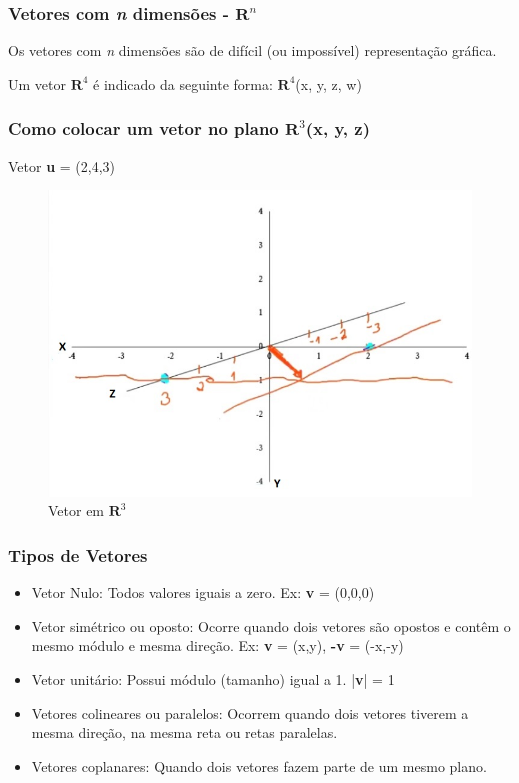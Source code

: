 \documentclass[12pt]{article}
\begin{document}
\subsubsection{Vetores com \textit{n} dimensões - \( \mathbf{R}^{n} \)}

Os vetores com \textit{n} dimensões são de difícil (ou impossível) representação gráfica.

Um vetor \( \mathbf{R}^{4} \) é indicado da seguinte forma: \( \mathbf{R}^{4} \)(x, y, z, w)

\subsubsection{Como colocar um vetor no plano \( \mathbf{R}^{3} \)(x, y, z)}

Vetor \textbf{u} = (2,4,3)

\begin{figure}[H]
	\centering
	\includegraphics[width=0.7\linewidth]{figuras/R3}
	\caption[Vetor em \( \mathbf{R}^{3} \)]{Vetor em \( \mathbf{R}^{3} \)}
	\label{fig:vetor r3}
\end{figure}

\subsubsection{Tipos de Vetores}

\begin{itemize}
	\item Vetor Nulo: Todos valores iguais a zero. Ex: \textbf{v} = (0,0,0)
	\item Vetor simétrico ou oposto: Ocorre quando dois vetores são opostos e contêm o mesmo módulo e mesma direção. Ex: \textbf{v} = (x,y), \textbf{-v} = (-x,-y)
	\item Vetor unitário: Possui módulo (tamanho) igual a 1. |\textbf{v}| = 1
	\item Vetores colineares ou paralelos: Ocorrem quando dois vetores tiverem a mesma direção, na mesma reta ou retas paralelas.
	\item Vetores coplanares: Quando dois vetores fazem parte de um mesmo plano.
		
\end{itemize}
\end{document}
